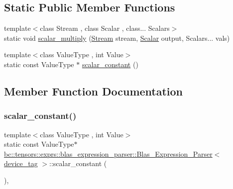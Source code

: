 \subsection*{Static Public Member Functions}
\begin{DoxyCompactItemize}
\item 
{\footnotesize template$<$class Stream , class Scalar , class... Scalars$>$ }\\static void \hyperlink{structbc_1_1tensors_1_1exprs_1_1blas__expression__parser_1_1Blas__Expression__Parser_3_01device__tag_01_4_accba509d7e3189856b27fc711429c58b}{scalar\+\_\+multiply} (\hyperlink{classbc_1_1streams_1_1Stream}{Stream} stream, \hyperlink{namespacebc_aa12ac55ee2c43dc082894dd3859daee1}{Scalar} output, Scalars... vals)
\item 
{\footnotesize template$<$class Value\+Type , int Value$>$ }\\static const Value\+Type $\ast$ \hyperlink{structbc_1_1tensors_1_1exprs_1_1blas__expression__parser_1_1Blas__Expression__Parser_3_01device__tag_01_4_a1ec8f12e99d192ad8fbf1eb19dbf3a84}{scalar\+\_\+constant} ()
\end{DoxyCompactItemize}


\subsection{Member Function Documentation}
\mbox{\label{structbc_1_1tensors_1_1exprs_1_1blas__expression__parser_1_1Blas__Expression__Parser_3_01device__tag_01_4_a1ec8f12e99d192ad8fbf1eb19dbf3a84}} 
\subsubsection{\texorpdfstring{scalar\+\_\+constant()}{scalar\_constant()}}
{\footnotesize\ttfamily template$<$class Value\+Type , int Value$>$ \\
static const Value\+Type$\ast$ \hyperlink{structbc_1_1tensors_1_1exprs_1_1blas__expression__parser_1_1Blas__Expression__Parser}{bc\+::tensors\+::exprs\+::blas\+\_\+expression\+\_\+parser\+::\+Blas\+\_\+\+Expression\+\_\+\+Parser}$<$ \hyperlink{structbc_1_1device__tag}{device\+\_\+tag} $>$\+::scalar\+\_\+constant (\begin{DoxyParamCaption}{ }\end{DoxyParamCaption})\hspace{0.3cm}{\ttfamily [inline]}, {\ttfamily [static]}}

